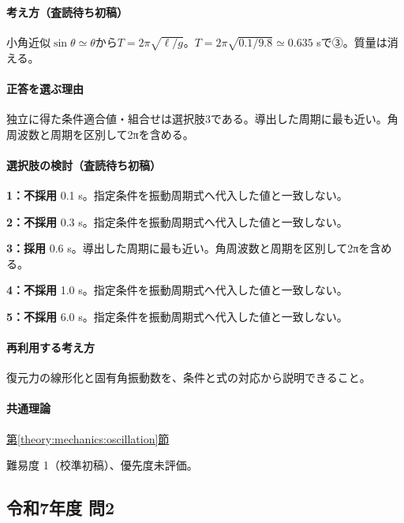 \paragraph{考え方（査読待ち初稿）} 小角近似\(\sin\theta\simeq\theta\)から\(T=2\pi\sqrt{\ell/g}\)。\(T=2\pi\sqrt{0.1/9.8}\simeq0.635\) sで③。質量は消える。

\paragraph{正答を選ぶ理由} 独立に得た条件適合値・組合せは選択肢3である。導出した周期に最も近い。角周波数と周期を区別して2πを含める。

\paragraph{選択肢の検討（査読待ち初稿）}

\noindent\textbf{1：不採用} 0.1 s。指定条件を振動周期式へ代入した値と一致しない。\par

\noindent\textbf{2：不採用} 0.3 s。指定条件を振動周期式へ代入した値と一致しない。\par

\noindent\textbf{3：採用} 0.6 s。導出した周期に最も近い。角周波数と周期を区別して2πを含める。\par

\noindent\textbf{4：不採用} 1.0 s。指定条件を振動周期式へ代入した値と一致しない。\par

\noindent\textbf{5：不採用} 6.0 s。指定条件を振動周期式へ代入した値と一致しない。\par

\paragraph{再利用する考え方} 復元力の線形化と固有角振動数を、条件と式の対応から説明できること。

\paragraph{共通理論} \hyperref[theory:mechanics:oscillation]{第\ref*{theory:mechanics:oscillation}節}

\par 難易度 1（校準初稿）、優先度未評価。

\subsection{令和7年度 問2}
\label{q:r07-reg-applied-02}


